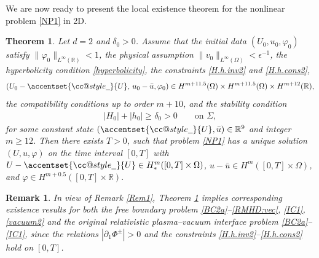 \documentclass[twoside,11pt]{article}
\makeatletter
\numberwithin{equation}{section}
\newtheorem{theorem}{Theorem}[section]
\newtheorem{remark}{Remark}[section]
\def\p{\partial}
\def\widebar{\accentset{{\cc@style\underline{\mskip10mu}}}}
\makeatother
\begin{document}

We are now ready to present the local existence theorem for the nonlinear problem \eqref{NP1} in 2D.

\begin{theorem}
	\label{thm:main3}
	Let $d=2$ and $\delta_0>0$.
	Assume that the initial data
	$(U_0, u_0, \varphi_0)$ satisfy  	$\|\varphi_0\|_{L^{\infty}(\mathbb{R})}<1$,
	{the physical assumption $\|v_0\|_{L^{\infty}(\Omega)}<\epsilon^{-1}$,}
	the hyperbolicity condition  \eqref{hyperbolicity},
	the constraints \eqref{H.h.inv2} and \eqref{H.h.cons2},
	\begin{align}  \label{initial:H2}
		(U_0-\widebar{U},\, u_0-\bar{u},\varphi_0)\in H^{m+11.5}(\Omega)\times  H^{m+11.5}(\Omega)\times  H^{m+12}(\mathbb{R}),
	\end{align}
	the compatibility conditions up to order $m+10$,
	and the stability condition
	\begin{align} \label{stability2D}
		|H_0|+| h_0 |    \geq \delta_0>0 \qquad \textrm{on } \Sigma,
	\end{align}
	for some constant state $(\widebar{U},\bar{u})\in\mathbb{R}^9$ and integer $m\geq 12$.
	Then there exists $T>0$,
	such that problem \eqref{NP1} has a unique solution $(U,u, \varphi)$ on the time interval $[0, T]$ with
	$U-\widebar{U}\in H_{*}^{m}([0,T]\times\Omega)$,
	$u-\bar{u}\in H^{m}([0,T]\times\Omega)$, and
	$ \varphi\in  H^{m+0.5}([0,T]\times\mathbb{R}).$
\end{theorem}


\begin{remark}
	In view of Remark \ref{Rem1}, %
	Theorem \ref{thm:main3} implies corresponding existence results for both the free boundary problem \eqref{BC2a}--\eqref{RMHD:vec}, \eqref{IC1}, \eqref{vacuum2} and the original relativistic plasma--vacuum interface problem \eqref{BC2a}--\eqref{IC1},
	since the relations $|\p_1\Phi^{\pm}|>0$  and the constraints \eqref{H.h.inv2}--\eqref{H.h.cons2} hold on $[0, T]$.
\end{remark}
\end{document}
